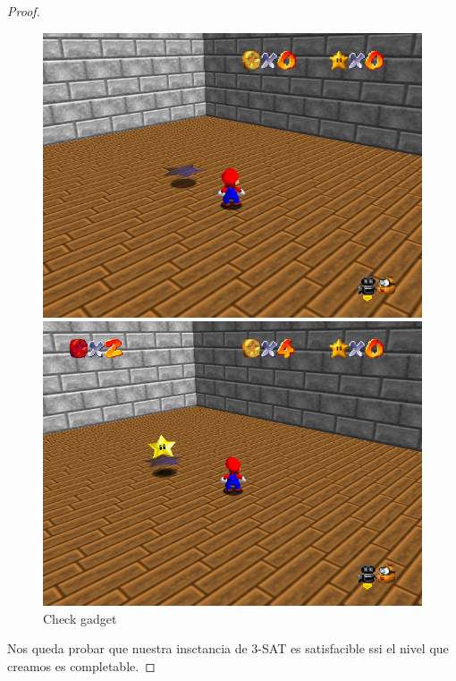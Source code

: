 \documentclass[runningheads]{llncs}
\begin{document}
\begin{proof}
\begin{figure}
    \centering
    \begin{minipage}{0.45\textwidth}
        \centering
        \includegraphics[width=\textwidth]{./Pictures/finish-not-satisfiable.png}
    \end{minipage}
    \hfill
    \begin{minipage}{0.45\textwidth}
        \centering
        \includegraphics[width=\textwidth]{./Pictures/finish-satisfiable.png}
    \end{minipage}
    \caption{Check gadget}
    \label{check-gadget}
\end{figure}

Nos queda probar que nuestra insctancia de 3-SAT es satisfacible ssi el nivel que creamos es completable.


\end{proof}
\end{document}
